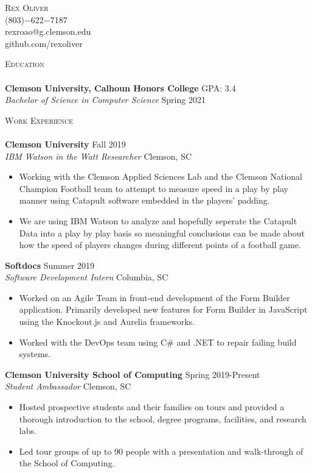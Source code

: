 \documentclass[a4paper]{article}
\newcommand{\lineunder} {
    \vspace*{-8pt} \\
    \hspace*{-18pt} \hrulefill \\
}
\newcommand{\header} [1] {
    {\hspace*{-18pt}\vspace*{6pt} \textsc{#1}}
    \vspace*{-6pt} \lineunder
}
\newcommand{\contact} [4] {
    \vspace*{-10pt}
    \begin{center}
        {\huge \scshape {#1}}\\
        #2 \\ #3 \\ #4
    \end{center}
    \vspace*{-8pt}
}
\newcommand{\beginninglist} [4] {
	
	\noindent \textbf{#1} \hfill \hfill #3\\ \noindent \textit{#2} \hfill \hfill #4 \\    
}
\begin{document}
\vspace*{-40pt}

\contact {Rex Oliver}{(803)$-$622$-$7187}{rexroao@g.clemson.edu}{github.com/rexoliver}

\header {Education}
\beginninglist {Clemson University, Calhoun Honors College} {Bachelor of Science in Computer Science} {GPA: 3.4} {Spring 2021} \vspace{3pt}

\header {Work Experience}
\beginninglist {Clemson University} {IBM Watson in the Watt Researcher} {Fall 2019} {Clemson, SC} \vspace{-8pt}
\begin{itemize}
	\item Working with the Clemson Applied Sciences Lab and the Clemson National Champion Football team to attempt to measure speed in a play by play manner using Catapult software embedded in the players' padding. \vspace{-5pt}
	\item We are using IBM Watson to analyze and hopefully seperate the Catapult Data into a play by play basis so meaningful conclusions can be made about how the speed of players changes during different points of a football game. \vspace{-5pt}
\end{itemize}	
\beginninglist {Softdocs} {Software Development Intern} {Summer 2019} {Columbia, SC} \vspace{-8pt}
\begin{itemize}
	\item Worked on an Agile Team in front-end development of the Form Builder application. Primarily developed new features for Form Builder in JavaScript using the Knockout.js and Aurelia frameworks. \vspace{-5pt}
	\item Worked with the DevOps team using C\# and .NET to repair failing build systems. \vspace{-5pt}
\end{itemize}	
\beginninglist {Clemson University School of Computing} {Student Ambassador} {Spring 2019-Present} {Clemson, SC} \vspace{-8pt}
\begin{itemize}
	\item Hosted prospective students and their families on tours and provided a thorough introduction to the school, degree programs, facilities, and research labs.\vspace{-5pt}
	\item Led tour groups of up to 90 people with a presentation and walk-through of the School of Computing. \vspace{-5pt}
\end{itemize}	
\end{document}
